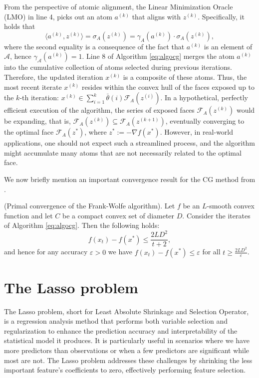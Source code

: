 \documentclass[10pt, twocolumn, reqno, a4paper,oneside]{amsart}
\numberwithin{equation}{section}
\numberwithin{theorem}{section}
\numberwithin{figure}{section}
\numberwithin{table}{section}
\numberwithin{theorem}{section}
\numberwithin{equation}{section}
\begin{document}
From the perspective of atomic alignment, the Linear Minimization Oracle (LMO) in line 4, picks out an atom $a^{(k)}$ that aligns with $z^{(k)}$. Specifically, it holds that
\begin{equation}
	\langle a^{(k)}, z^{(k)} \rangle = \sigma_A(z^{(k)}) = \gamma_A(a^{(k)}) \cdot \sigma_A(z^{(k)}),
\end{equation}
where the second equality is a consequence of the fact that $a^{(k)}$ is an element of $\mathcal{A}$, hence $\gamma_\mathcal{A}(a^{(k)}) = 1$. Line 8 of Algorithm \ref{eq:algocg} merges the atom $a^{(k)}$ into the cumulative collection of atoms selected during previous iterations. Therefore, the updated iteration $x^{(k)}$ is a composite of these atoms.
Thus, the most recent iterate $x^{(k)}$ resides within the convex hull of the faces exposed up to the $k$-th iteration: $x^{(k)} \in \sum_{i=1}^{k} \bar{\theta}(i) \mathcal{F}_A(z^{(i)})$. In a hypothetical, perfectly efficient execution of the algorithm, the series of exposed faces $\mathcal{F}_A(z^{(k)})$ would be expanding, that is, $\mathcal{F}_A(z^{(k)}) \subseteq \mathcal{F}_A(z^{(k+1)})$, eventually converging to the optimal face $\mathcal{F}_A(z^{*})$, where $z^{*} := -\nabla f(x^{*})$. However, in real-world applications, one should not expect such a streamlined process, and the algorithm might accumulate many atoms that are not necessarily related to the optimal face.

We now briefly mention an important convergence result for the CG method from \cite{pmlr-v28-jaggi13}.

\begin{theorem}
	(Primal convergence of the Frank-Wolfe algorithm). Let \( f \) be an \( L \)-smooth convex function and let \( C\) be a compact convex set of diameter \( D \). Consider the iterates of Algorithm \ref{eq:algocg}. Then the following holds:
	\[
	f(x_t) - f(x^{*}) \leq \frac{2LD^2}{t + 2},
	\]
	and hence for any accuracy \( \varepsilon > 0 \) we have \( f(x_t) - f(x^{*}) \leq \varepsilon \) for all \( t \geq \frac{2LD^2}{\varepsilon} \).
\end{theorem}


\section{The Lasso problem} \label{sec:lasso}
The Lasso problem, short for Least Absolute Shrinkage and Selection Operator, is a regression analysis method that performs both variable selection and regularization to enhance the prediction accuracy and interpretability of the statistical model it produces. It is particularly useful in scenarios where we have more predictors than observations or when a few predictors are significant while most are not. The Lasso problem addresses these challenges by shrinking the less important feature's coefficients to zero, effectively performing feature selection.
\end{document}
